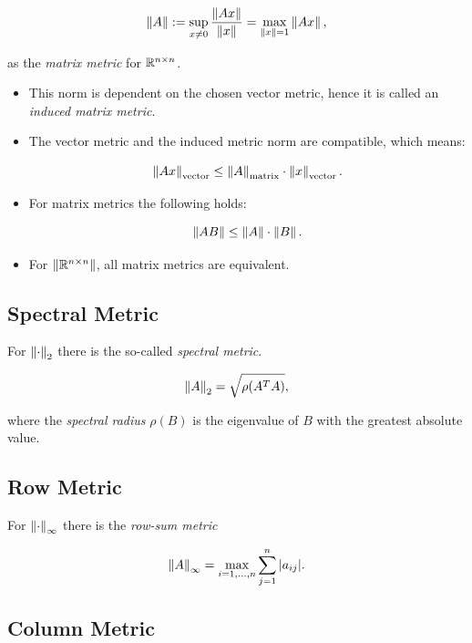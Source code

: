 \[
    \left\| A \right\| := \sup_{x \ne 0} \frac{\left\| Ax \right\|}{\left\| x \right\|} = \max_{\left\| x \right\| = 1} \left\| Ax \right\|,
\]

as the \emph{matrix metric} for \(\mathbb{R}^{n \times n}\).

\begin{itemize}

    \item This norm is dependent on the chosen vector metric, hence it is called an \emph{induced matrix metric}.

    \item The vector metric and the induced metric norm are compatible, which means: 

    \[
        \left\| Ax \right\|_{\text{vector}} \le \left\| A \right\|_{\text{matrix}} \cdot \left\| x \right\|_{\text{vector}}.
    \]

    \item For matrix metrics the following holds:

    \[
        \left\| AB \right\| \le \left\| A \right\| \cdot \left\| B \right\|.
    \]

    \item For \(\left\| \mathbb{R}^{n \times n} \right\|\), all matrix metrics are equivalent.

\end{itemize}

\subsection{Spectral Metric}

For \(\left\| \cdot \right\|_2\) there is the so-called \emph{spectral metric}. 

\[
    \left\| A \right\|_2 = \sqrt{\rho (A^T A)},
\]

where the \emph{spectral radius} \(\rho(B)\) is the eigenvalue of \(B\) with the greatest absolute value.

\subsection{Row Metric}

For \(\left\| \cdot \right\|_\infty\) there is the \emph{row-sum metric} 

\[
    \left\| A \right\|_\infty = \max_{i=1,\dots,n} \sum_{j = 1}^n |a_{ij}|.
\]

\subsection{Column Metric}


